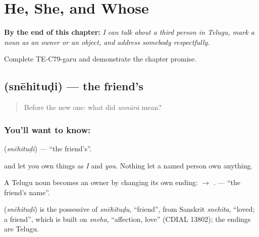 
\chapter{He, She, and Whose}
\label{ch:te-he-she-and-whose}

\begin{chapteropening}
\textbf{By the end of this chapter:} \emph{I can talk about a third person in Telugu, mark a noun as an owner or an object, and address somebody respectfully.}

Complete TE-C79-garu and demonstrate the chapter promise.
\end{chapteropening}

\section[\texorpdfstring{\te{స్నేహితుడి} (snēhituḍi)}{స్నేహితుడి (snēhituḍi)}]{ (snēhituḍi) — the friend's}

\label{lesson:TE-C79-friends}



\begin{quote}
Before the new one: what did \emph{unnārā} mean?
\end{quote}

\subsection*{You'll want to know: }
\textbf{} (\emph{snēhituḍi}) — \textquotedblleft{}the friend's\textquotedblright{}.

 and  let you own things as \emph{I} and \emph{you}. Nothing let a named person own anything.

A Telugu noun becomes an owner by changing its own ending:  $\to$ . \textbf{ } — \textquotedblleft{}the friend's name\textquotedblright{}.

\begin{cousinweb}
\textbf{} (\emph{snēhituḍi}) is the possessive of \emph{snēhituḍu}, \textquotedblleft{}friend\textquotedblright{}, from Sanskrit \emph{snehita}, \textquotedblleft{}loved; a friend\textquotedblright{}, which is built on \emph{sneha}, \textquotedblleft{}affection, love\textquotedblright{} (CDIAL 13802); the endings are Telugu.
\end{cousinweb}

